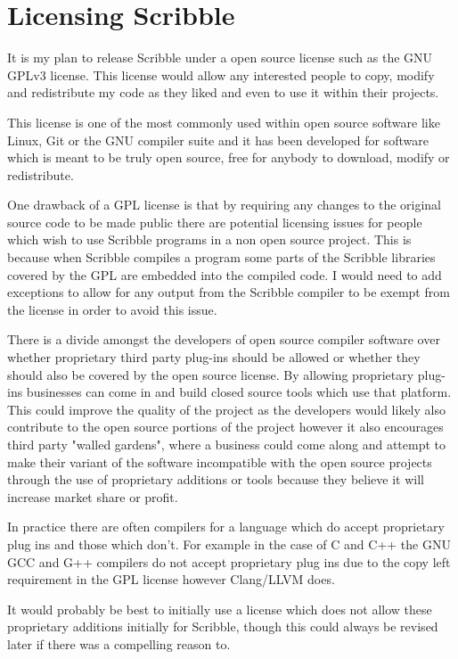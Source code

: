 \documentclass[]{final_report}
\begin{document}
\section{Licensing Scribble}

It is my plan to release Scribble under a open source license such as the GNU GPLv3 license. This license would allow any interested people to copy, modify and redistribute my code as they liked and even to use it within their projects.

This license is one of the most commonly used within open source software like Linux, Git or the GNU compiler suite and it has been developed for software which is meant to be truly open source, free for anybody to download, modify or redistribute.

One drawback of a GPL license is that by requiring any changes to the original source code to be made public there are potential licensing issues for people which wish to use Scribble programs in a non open source project. This is because when Scribble compiles a program some parts of the Scribble libraries covered by the GPL are embedded into the compiled code. I would need to add exceptions to allow for any output from the Scribble compiler to be exempt from the license in order to avoid this issue.

There is a divide amongst the developers of open source compiler software over whether proprietary third party plug-ins should be allowed or whether they should also be covered by the open source license. By allowing proprietary plug-ins businesses can come in and build closed source tools which use that platform. This could improve the quality of the project as the developers would likely also contribute to the open source portions of the project however it also encourages third party "walled gardens", where a business could come along and attempt to make their variant of the software incompatible with the open source projects through the use of proprietary additions or tools because they believe it will increase market share or profit.

In practice there are often compilers for a language which do accept proprietary plug ins and those which don't. For example in the case of C and C++ the GNU GCC and G++ compilers do not accept proprietary plug ins due to the copy left requirement in the GPL license however Clang/LLVM does.

It would probably be best to initially use a license which does not allow these proprietary additions initially for Scribble, though this could always be revised later if there was a compelling reason to.
\end{document}

